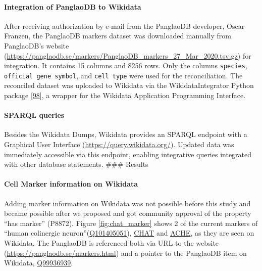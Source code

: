 \hypertarget{integration-of-panglaodb-to-wikidata}{%
\paragraph{Integration of PanglaoDB to Wikidata}\label{integration-of-panglaodb-to-wikidata}}

After receiving authorization by e-mail from the PanglaoDB developer, Oscar Franzen, the PanglaoDB markers dataset was downloaded manually from PanglaoDB's website (\url{https://panglaodb.se/markers/PanglaoDB_markers_27_Mar_2020.tsv.gz}) for integration. It contains 15 columns and 8256 rows. Only the columns \texttt{species}, \texttt{official\ gene\ symbol}, and \texttt{cell\ type} were used for the reconciliation.
The reconciled dataset was uploaded to Wikidata via the WikidataIntegrator Python package {[}\protect\hyperlink{ref-qDI8I4IJ}{98}{]}, a wrapper for the Wikidata Application Programming Interface.

\hypertarget{sparql-queries}{%
\paragraph{SPARQL queries}\label{sparql-queries}}

Besides the Wikidata Dumps, Wikidata provides an SPARQL endpoint with a Graphical User Interface (\url{https://query.wikidata.org/}).
Updated data was immediately accessible via this endpoint, enabling integrative queries integrated with other database statements.
\#\#\# Results

\hypertarget{cell-marker-information-on-wikidata}{%
\paragraph{Cell Marker information on Wikidata}\label{cell-marker-information-on-wikidata}}

Adding marker information on Wikidata was not possible before this study and became possible after we proposed and got community approval of the property ``has marker'' (P8872).
Figure \ref{fig:chat_marker} shows 2 of the current markers of ``human colinergic neuron''(\href{http://www.wikidata.org/entity/Q101405051}{Q101405051}), \href{http://www.wikidata.org/entity/Q14863671}{CHAT} and \href{http://www.wikidata.org/entity/Q407983}{ACHE}, as they are seen on Wikidata.
The PanglaoDB is referenced both via URL to the website (\url{https://panglaodb.se/markers.html}) and a pointer to the PanglaoDB item on Wikidata, \href{http://www.wikidata.org/entity/Q99936939}{Q99936939}.

